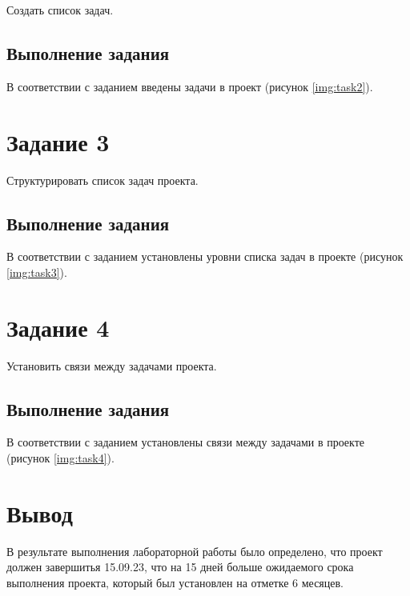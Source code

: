 Создать список задач.

\subsection{Выполнение задания}

В соответствии с заданием введены задачи в проект (рисунок \ref{img:task2}).



\section{Задание 3}

Структурировать список задач проекта.

\subsection{Выполнение задания}

В соответствии с заданием установлены уровни списка задач в проекте (рисунок \ref{img:task3}).



\section{Задание 4}

Установить связи между задачами проекта.

\subsection{Выполнение задания}

В соответствии с заданием установлены связи между задачами в проекте (рисунок \ref{img:task4}).



\section*{Вывод}

В результате выполнения лабораторной работы было определено, что проект должен завершитья 15.09.23, что на 15 дней больше ожидаемого срока выполнения проекта, который был установлен на отметке 6 месяцев.
